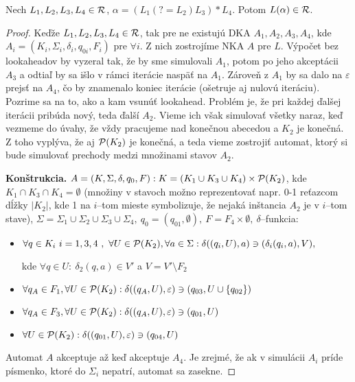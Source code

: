 \begin{lema}\label{lookahead s *}
Nech $L_1,L_2,L_3,L_4 \in \R$, $\alpha = \left( L_1 \left( ?=L_2\right) L_3 \right) * L_4$. Potom $L(\alpha) \in \R$.
\end{lema} 
\begin{proof}
Keďže $L_1,L_2,L_3,L_4 \in \R$, tak pre ne existujú DKA $A_1,A_2,A_3,A_4$, kde $A_i = \left( K_i, \Sigma_i, \delta_i, q_{0i}, F_i \right)$ pre $\forall i$. Z nich zostrojíme NKA $A$ pre $L$. Výpočet bez lookaheadov by vyzeral tak, že by sme simulovali $A_1$, potom po jeho akceptácii $A_3$ a odtiaľ by sa išlo v rámci iterácie naspäť na $A_1$. Zároveň z $A_1$ by sa dalo na $\varepsilon$ prejsť na $A_4$, čo by znamenalo koniec iterácie (ošetruje aj nulovú iteráciu). Pozrime sa na to, ako a kam vsunúť lookahead. Problém je, že pri každej ďalšej iterácii pribúda nový, teda ďalší $A_2$. Vieme ich však simulovať všetky naraz, keď vezmeme do úvahy, že vždy pracujeme nad konečnou abecedou a $K_2$ je konečná. Z toho vyplýva, že aj $\P(K_2)$ je konečná, a teda vieme zostrojiť automat, ktorý si bude simulovať prechody medzi množinami stavov $A_2$.

\textbf{Konštrukcia.} $A = (K,\Sigma ,\delta ,q_0,F) : K = (K_1\cup K_3\cup K_4)\times \P(K_2)$, kde $K_1 \cap K_3 \cap K_4 = \emptyset$ (množiny v stavoch možno reprezentovať napr. 0-1 reťazcom dĺžky $\left\vert{K_2}\right\vert$, kde 1 na $i$--tom mieste symbolizuje, že nejaká inštancia $A_2$ je v $i$--tom stave), $\Sigma = \Sigma_1 \cup \Sigma_2 \cup \Sigma_3 \cup \Sigma_4, ~q_0 = (q_{01},\emptyset ), ~ F = F_4\times \emptyset,~\delta$--funkcia:
 
\begin{itemize}
  \item $\forall q \in K_i~i=1,3,4 ~, ~\forall U \in \P(K_2),\forall a \in \Sigma : \delta ((q_i,U),a) \ni (\delta _i (q_i,a),V),$
  
  kde $\forall q \in U:~\delta_2(q,a) \in V'$ a  $V=V'\setminus F_2$
  \item $\forall q_A \in F_1, \forall U \in \P(K_2) : \delta ((q_A,U),\varepsilon ) \ni (q_{03},U \cup \lbrace q_{02} \rbrace)$
  \item $\forall q_A \in F_3, \forall U \in \P(K_2) : \delta ((q_A,U),\varepsilon ) \ni (q_{01},U)$
  \item $\forall U \in \P(K_2) : \delta ((q_{01},U),\varepsilon ) \ni (q_{04},U)$
\end{itemize}

Automat $A$ akceptuje až keď akceptuje $A_4$. Je zrejmé, že ak v simulácii $A_i$ príde písmenko, ktoré do $\Sigma_i$ nepatrí, automat sa zasekne.


\end{proof}

